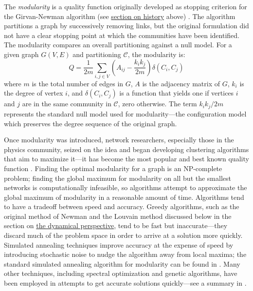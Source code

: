 The \emph{modularity} is a quality function originally developed as
stopping criterion for the Girvan-Newman algorithm (see
\protect\hyperlink{history}{section on history} above)
\autocites{newman_finding_2004}{newman_modularity_2006}. The algorithm
partitions a graph by successively removing links, but the original
formulation did not have a clear stopping point at which the communities
have been identified. The modularity compares an overall partitioning
against a null model. For a given graph \(G(V, E)\) and partitioning
\(\mathcal{C}\), the modularity is:
\[Q = \frac{1}{2m} \sum_{i,j \in V} \left(A_{ij} - \frac{k_i k_j}{2m}\right) \delta(C_i, C_j)\]
where \(m\) is the total number of edges in \(G\), \(A\) is the
adjacency matrix of \(G\), \(k_i\) is the degree of vertex \(i\), and
\(\delta(C_i, C_j)\) is a function that yields one if vertices \(i\) and
\(j\) are in the same community in \(\mathcal{C}\), zero otherwise. The
term \(k_i k_j / 2m\) represents the standard null model used for
modularity---the configuration model which preserves the degree sequence
of the original graph.

Once modularity was introduced, network researchers, especially those in
the physics community, seized on the idea and began developing
clustering algorithms that aim to maximize it---it has become the most
popular and best known quality function
\autocite{fortunato_community_2010}. Finding the optimal modularity for
a graph is an NP-complete problem; finding the global maximum for
modularity on all but the smallest networks is computationally
infeasible, so algorithms attempt to approximate the global maximum of
modularity in a reasonable amount of time. Algorithms tend to have a
tradeoff between speed and accuracy. Greedy algorithms, such as the
original method of Newman \autocite{newman_fast_2004} and the Louvain
method \autocite{blondel_fast_2008} discussed below in the section on
\protect\hyperlink{the-dynamical-perspective}{the dynamical
perspective}, tend to be fast but inaccurate---they discard much of the
problem space in order to arrive at a solution more quickly. Simulated
annealing techniques improve accuracy at the expense of speed by
introducing stochastic noise to nudge the algorithm away from local
maxima; the standard simulated annealing algorithm for modularity can be
found in \autocite{guimera_functional_2005}. Many other techniques,
including spectral optimization and genetic algorithms, have been
employed in attempts to get accurate solutions quickly---see a summary
in \autocite{fortunato_community_2010}.

